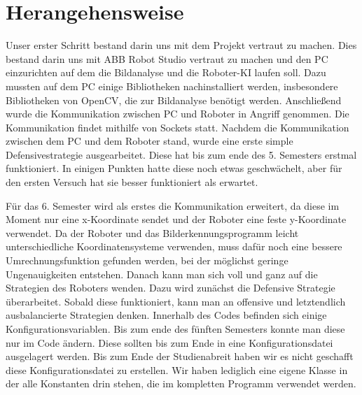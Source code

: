 \newpage

\chapter{Herangehensweise}
Unser erster Schritt bestand darin uns mit dem Projekt vertraut zu machen. Dies bestand darin uns mit ABB Robot Studio vertraut zu machen und den PC einzurichten auf dem die Bildanalyse und die Roboter-KI laufen soll. Dazu mussten auf dem PC einige Bibliotheken nachinstalliert werden, insbesondere Bibliotheken von OpenCV, die zur Bildanalyse benötigt werden. Anschließend wurde die Kommunikation zwischen PC und Roboter in Angriff genommen. Die Kommunikation findet mithilfe von Sockets statt. Nachdem die Kommunikation zwischen dem PC und dem Roboter stand, wurde eine erste simple Defensivestrategie ausgearbeitet. Diese hat bis zum ende des 5. Semesters erstmal funktioniert. In einigen Punkten hatte diese noch etwas geschwächelt, aber für den ersten Versuch hat sie besser funktioniert als erwartet.

Für das 6. Semester wird als erstes die Kommunikation erweitert, da diese im Moment nur eine x-Koordinate sendet und der Roboter eine feste y-Koordinate verwendet. Da der Roboter und das Bilderkennungsprogramm leicht unterschiedliche Koordinatensysteme verwenden, muss dafür noch eine bessere Umrechnungsfunktion gefunden werden, bei der möglichst geringe Ungenauigkeiten entstehen. Danach kann man sich voll und ganz auf die Strategien des Roboters wenden. Dazu wird zunächst die Defensive Strategie überarbeitet. Sobald diese funktioniert, kann man an offensive und letztendlich ausbalancierte Strategien denken. Innerhalb des Codes befinden sich einige Konfigurationsvariablen. Bis zum ende des fünften Semesters konnte man diese nur im Code ändern. Diese sollten bis zum Ende in eine Konfigurationsdatei ausgelagert werden. Bis zum Ende der Studienabreit haben wir es nicht geschafft diese Konfigurationsdatei zu erstellen. Wir haben lediglich eine eigene Klasse in der alle Konstanten drin stehen, die im kompletten Programm verwendet werden.

